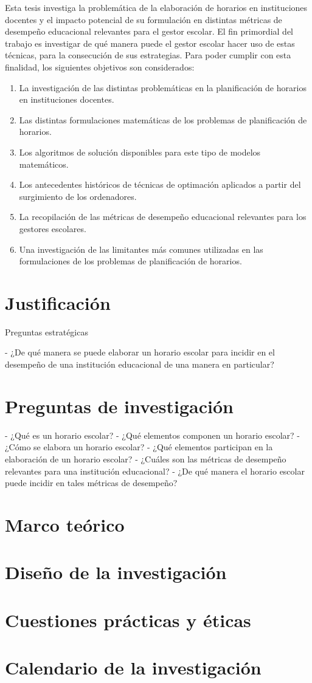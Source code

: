 \documentclass[draft,12pt,headsepline,footsepline,paper=letter]{scrreprt}
\begin{document}
Esta tesis investiga la problemática de la elaboración de horarios en instituciones docentes y el impacto potencial de su formulación en distintas métricas de desempeño educacional relevantes para el gestor escolar. 
El fin primordial del trabajo es investigar de qué manera puede el gestor escolar hacer uso de estas técnicas, para la consecución de sus estrategias.
Para poder cumplir con esta finalidad, los siguientes objetivos son considerados:
\begin{enumerate}[1]
\item La investigación de las distintas problemáticas en la planificación de horarios en instituciones docentes.
\item Las distintas formulaciones matemáticas de los problemas de planificación de horarios.
\item Los algoritmos de solución disponibles para este tipo de modelos matemáticos.
\item Los antecedentes históricos de técnicas de optimación aplicados a partir del surgimiento de los ordenadores.
\item La recopilación de las métricas de desempeño educacional relevantes para los gestores escolares.
\item Una investigación de las limitantes más comunes utilizadas en las formulaciones de los problemas de planificación de horarios.
\end{enumerate}
\section{Justificación}

Preguntas estratégicas

- ¿De qué manera se puede elaborar un horario escolar para incidir en el desempeño de una institución educacional de una manera en particular?

\section{Preguntas de investigación}

- ¿Qué es un horario escolar?
- ¿Qué elementos componen un horario escolar?
- ¿Cómo se elabora un horario escolar? 
- ¿Qué elementos participan en la elaboración de un horario escolar?
- ¿Cuáles son las métricas de desempeño relevantes para una institución educacional?
- ¿De qué manera el horario escolar puede incidir en tales métricas de desempeño?

\section{Marco teórico}
\section{Diseño de la investigación}
\section{Cuestiones prácticas y éticas}
\section{Calendario de la investigación}

\end{document}
